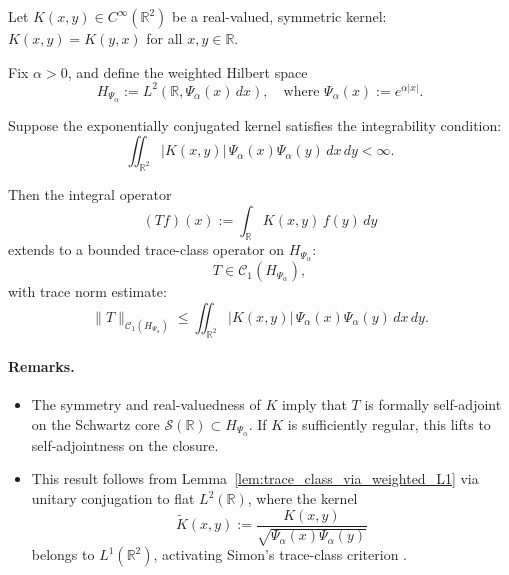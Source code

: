 \begin{lemma}
\label{lem:trace_class_conjugated_kernel}
Let \( K(x, y) \in C^\infty(\mathbb{R}^2) \) be a real-valued, symmetric kernel: \( K(x,y) = K(y,x) \) for all \( x,y \in \mathbb{R} \).

Fix \( \alpha > 0 \), and define the weighted Hilbert space
\[
H_{\Psi_\alpha} := L^2(\mathbb{R}, \Psi_\alpha(x)\, dx), \quad \text{where } \Psi_\alpha(x) := e^{\alpha |x|}.
\]

Suppose the exponentially conjugated kernel satisfies the integrability condition:
\[
\iint_{\mathbb{R}^2} |K(x, y)| \, \Psi_\alpha(x) \Psi_\alpha(y) \, dx\, dy < \infty.
\]

Then the integral operator
\[
(T f)(x) := \int_{\mathbb{R}} K(x, y)\, f(y)\, dy
\]
extends to a bounded trace-class operator on \( H_{\Psi_\alpha} \):
\[
T \in \mathcal{C}_1(H_{\Psi_\alpha}),
\]
with trace norm estimate:
\[
\| T \|_{\mathcal{C}_1(H_{\Psi_\alpha})}
\le \iint_{\mathbb{R}^2} |K(x, y)|\, \Psi_\alpha(x)\Psi_\alpha(y)\, dx\, dy.
\]

\paragraph{Remarks.}
\begin{itemize}
    \item The symmetry and real-valuedness of \( K \) imply that \( T \) is formally self-adjoint on the Schwartz core \( \mathcal{S}(\mathbb{R}) \subset H_{\Psi_\alpha} \). If \( K \) is sufficiently regular, this lifts to self-adjointness on the closure.
    
    \item This result follows from Lemma~\ref{lem:trace_class_via_weighted_L1} via unitary conjugation to flat \( L^2(\mathbb{R}) \), where the kernel
    \[
    \widetilde{K}(x,y) := \frac{K(x,y)}{\sqrt{\Psi_\alpha(x)\Psi_\alpha(y)}}
    \]
    belongs to \( L^1(\mathbb{R}^2) \), activating Simon's trace-class criterion \cite[Thm.~4.2]{Simon2005TraceIdeals}.
\end{itemize}
\end{lemma}
